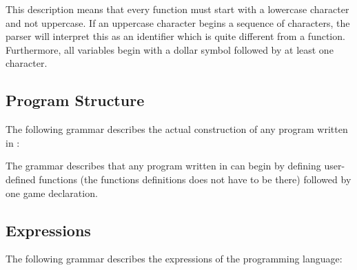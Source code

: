 This description means that every function must start with a lowercase character and not uppercase. If an uppercase character begins a sequence of characters, the parser will interpret this as an identifier which is quite different from a function. Furthermore, all variables begin with a dollar symbol followed by at least one character.

\subsection{Program Structure}
The following grammar describes the actual construction of any program written in \productname{}:

\begin{ebnf}
\end{ebnf}

The grammar describes that any program written in \productname{} can begin by defining user-defined functions (the functions definitions does not have to be there) followed by one game declaration. 

\subsection{Expressions}
The following grammar describes the expressions of the programming language:

